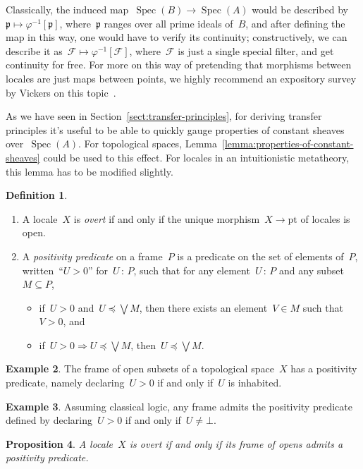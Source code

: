 \documentclass[10pt,reqno,a4paper]{amsbook}
\theoremstyle{definition}
\newtheorem{defn}{Definition}[section]
\newtheorem{ex}[defn]{Example}
\theoremstyle{plain}
\newtheorem{prop}[defn]{Proposition}
\theoremstyle{remark}
\newcommand{\F}{\mathcal{F}}
\newcommand{\ppp}{\mathfrak{p}}
\newcommand{\pt}{\mathrm{pt}}
\DeclareMathOperator{\Spec}{Spec}
\newcommand{\?}{\,{:}\,}
\renewcommand{\_}{\mathpunct{.}\,}
\begin{document}
{Classically, the induced map~$\Spec(B) \to \Spec(A)$ would be described
by~$\ppp \mapsto \varphi^{-1}[\ppp]$, where~$\ppp$ ranges over all prime ideals
of~$B$, and after defining the map in this way, one would have to verify its
continuity; constructively, we can describe it as~$\F \mapsto \varphi^{-1}[\F]$,
where~$\F$ is just a single special filter, and get continuity for free.
For more on this way of pretending that morphisms between locales are just maps
between points, we highly recommend an expository survey by Vickers on this
topic~\cite{vickers:continuity}.

As we have seen in Section~\ref{sect:transfer-principles}, for deriving
transfer principles it's useful to be able to quickly gauge properties of
constant sheaves over~$\Spec(A)$. For topological spaces,
Lemma~\ref{lemma:properties-of-constant-sheaves} could be used to this effect.
For locales in an intuitionistic metatheory, this lemma has to be modified
slightly.

\begin{defn}\begin{enumerate}
\item A locale~$X$ is \emph{overt} if and only if the unique morphism~$X
\to \pt$ of locales is open.
\item A \emph{positivity predicate} on a frame~$P$ is a predicate on the set of
elements of~$P$, written~``$U > 0$'' for~$U \? P$, such that for any element~$U
\? P$ and any subset~$M \subseteq P$,
\begin{itemize}
\item if~$U > 0$ and~$U
\preceq \bigvee M$, then there exists an element~$V \in
M$ such that~$V > 0$, and
\item if~$U > 0 \Longrightarrow U \preceq \bigvee M$, then~$U \preceq \bigvee M$.
\end{itemize}
\end{enumerate}
\end{defn}

\begin{ex}The frame of open subsets of a topological space~$X$ has a positivity
predicate, namely declaring~$U > 0$ if and only if~$U$ is inhabited.\end{ex}

\begin{ex}Assuming classical logic, any frame admits the positivity predicate
defined by declaring~$U > 0$ if and only if~$U \neq \bot$.\end{ex}

\begin{prop}A locale~$X$ is overt if and only if its frame of opens admits a
\emph{positivity predicate}.\end{prop}

}
\end{document}

